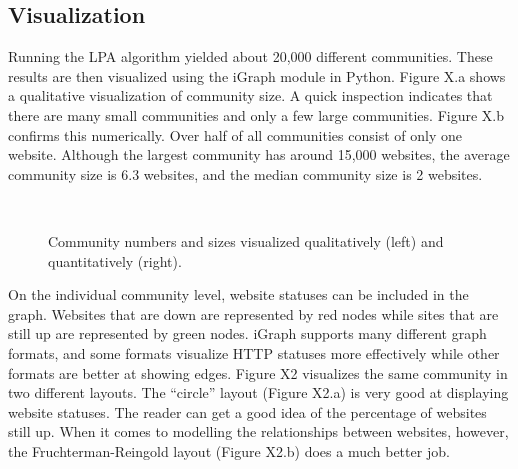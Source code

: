 \documentclass[conference]{IEEEtran}
\begin{document}
\subsection{Visualization}

Running the LPA algorithm yielded about 20,000 different communities. These results are then visualized using the iGraph module in Python. Figure X.a shows a qualitative visualization of community size. A quick inspection indicates that there are many small communities and only a few large communities. Figure X.b confirms this numerically. Over half of all communities consist of only one website. Although the largest community has around 15,000 websites, the average community size is 6.3 websites, and the median community size is 2 websites.

\begin{figure}[htbp]
    \centering
    \\
    \caption{Community numbers and sizes visualized qualitatively (left) and quantitatively (right).}
    \label{fig}
\end{figure}

On the individual community level, website statuses can be included in the graph. Websites that are down are represented by red nodes while sites that are still up are represented by green nodes. iGraph supports many different graph formats, and some formats visualize HTTP statuses more effectively while other formats are better at showing edges. Figure X2 visualizes the same community in two different layouts. The “circle” layout (Figure X2.a) is very good at displaying website statuses. The reader can get a good idea of the percentage of websites still up. When it comes to modelling the relationships between websites, however, the Fruchterman-Reingold layout (Figure X2.b) does a much better job.
\end{document}
